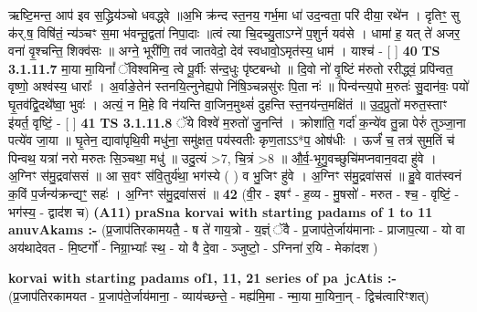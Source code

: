 \documentclass[17pt]{extarticle}
\begin{document}
                  ऋष्टि॒मन्त॒ आप॑ इव स॒द्ध्रिय॑ञ्चो धवद्ध्वे ॥अ॒भि क्र॑न्द स्त॒नय॒ गर्भ॒मा धा॑ उद॒न्वता॒ परि॑ दीया॒ रथे॑न । दृतिꣳ॒॒ सु क॑र्.ष॒ विषि॑तं॒ न्य॑ञ्चꣳ स॒मा भ॑वन्तू॒द्वता॑ निपा॒दाः ॥त्वं त्या चि॒दच्यु॒ताऽग्ने॑ प॒शुर्न यव॑से । धामा॑ ह॒ यत् ते॑ अजर॒ वना॑ वृ॒श्चन्ति॒ शिक्व॑सः ॥ अग्ने॒ भूरी॑णि॒ तव॑ जातवेदो॒ देव॑ स्वधावो॒ऽमृत॑स्य॒ धाम॑ । याश्च॑ - [  ] \textbf{  40} \newline
                  \newline
                                \textbf{ TS 3.1.11.7} \newline
                  मा॒या मा॒यिनां᳚ ॅविश्वमिन्व॒ त्वे पू॒र्वीः स॑न्द॒धुः पृ॑ष्टबन्धो ॥ दि॒वो नो॑ वृ॒ष्टिं म॑रुतो ररीद्ध्वं॒ प्रपि॑न्वत॒ वृष्णो॒ अश्व॑स्य॒ धाराः᳚ । अ॒र्वाङे॒तेन॑ स्तनयि॒त्नुनेह्य॒पो नि॑षि॒ञ्चन्नसु॑रः पि॒ता नः॑ ॥ पिन्व॑न्त्य॒पो म॒रुतः॑ सु॒दान॑वः॒ पयो॑ घृ॒तव॑द्वि॒दथे᳚ष्वा॒ भुवः॑ । अत्यं॒ न मि॒हे वि न॑यन्ति वा॒जिन॒मुथ्सं॑ दुहन्ति स्त॒नय॑न्त॒मक्षि॑तं ॥ उ॒द॒प्रुतो॑ मरुत॒स्ताꣳ इ॑यर्त॒ वृष्टिं॒ - [  ] \textbf{  41} \newline
                  \newline
                                \textbf{ TS 3.1.11.8} \newline
                  ॅये विश्वे॑ म॒रुतो॑ जु॒नन्ति॑ । क्रोशा॑ति॒ गर्दा॑ क॒न्ये॑व तु॒न्ना पेरुं॑ तुञ्जा॒ना पत्ये॑व जा॒या ॥ घृ॒तेन॒ द्यावा॑पृथि॒वी मधु॑ना॒ समु॑क्षत॒ पय॑स्वतीः कृण॒ताऽऽ*प॒ ओष॑धीः । ऊर्जं॑ च॒ तत्र॑ सुम॒तिं च॑ पिन्वथ॒ यत्रा॑ नरो मरुतः सि॒ञ्चथा॒ मधु॑ ॥ उदु॒त्यं >7, चि॒त्रं >8 ॥ औ॒र्व॒-भृ॒गु॒वच्छुचि॑मप्नवान॒वदा हु॑वे । अ॒ग्निꣳ स॑मु॒द्रवा॑ससं ॥ आ स॒वꣳ स॑वि॒तुर्य॑था॒ भग॑स्ये ( ) व भु॒जिꣳ हु॑वे । अ॒ग्निꣳ स॑मु॒द्रवा॑ससं ॥ हु॒वे वात॑स्वनं क॒विं प॒र्जन्य॑क्रन्द्यꣳ॒॒ सहः॑ । अ॒ग्निꣳ स॑मु॒द्रवा॑ससं ॥ \textbf{  42 } \newline
                  \newline
                      (वी॒र - इषꣳ॑ - ह॒व्य - मु॒षसो॑ - मरुत - श्च॒ - वृष्टिं॒ - भग॑स्य॒ - द्वाद॑श च)  \textbf{(A11)} \newline \newline
                \textbf{praSna korvai with starting padams of 1 to 11 anuvAkams :-} \newline
        (प्र॒जाप॑तिरकामयतै॒ - ष ते॑ गाय॒त्रो - य॒ज्ञ्ं ॅवै - प्र॒जाप॑ते॒र्जाय॑मानाः - प्राजाप॒त्या - यो वा अय॑थादेवत - मि॒ष्टर्गो॑ - निग्रा॒भ्याः᳚ स्थ॒ - यो वै दे॒वा - ञ्जुष्टो॒ - ऽग्निना॑ र॒यि - मेका॑दश ) \newline

        \textbf{korvai with starting padams of1, 11, 21 series of pa~jcAtis :-} \newline
        (प्र॒जाप॑तिरकामयत - प्र॒जाप॑ते॒र्जाय॑माना॒ - व्याय॑च्छन्ते॒ - मह्य॑मि॒मा - न्मा॒या मा॒यिना॒न् - द्विच॑त्वारिꣳशत्) \newline
\end{document}
